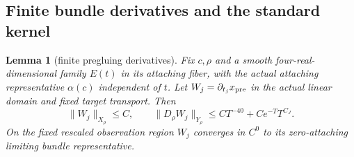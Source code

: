 \documentclass[11pt]{amsart}
\newtheorem{lemma}[theorem]{Lemma}
\theoremstyle{definition}
\theoremstyle{remark}
\theoremstyle{plain}
\begin{document}
\subsection{Finite bundle derivatives and the standard kernel}

\begin{lemma}[finite pregluing derivatives]\label{lem:gluing-finite-derivatives}
Fix $c,\rho$ and a smooth four-real-dimensional family $E(t)$
in its attaching fiber, with the actual attaching representative
$\alpha(c)$ independent of $t$. Let $W_j=\partial_{t_j}x_{\rm pre}$
in the actual linear domain and fixed target transport. Then
\begin{equation}\label{eq:gluing-finite-derivative-bounds}
 \|W_j\|_{X_\rho}\leq C,\qquad
 \|D_\rho W_j\|_{Y_\rho}\leq CT^{-40}+Ce^{-T}T^{C_J}.
\end{equation}
On the fixed rescaled observation region $W_j$ converges in $C^0$
to its zero-attaching limiting bundle representative.
\end{lemma}
\end{document}
